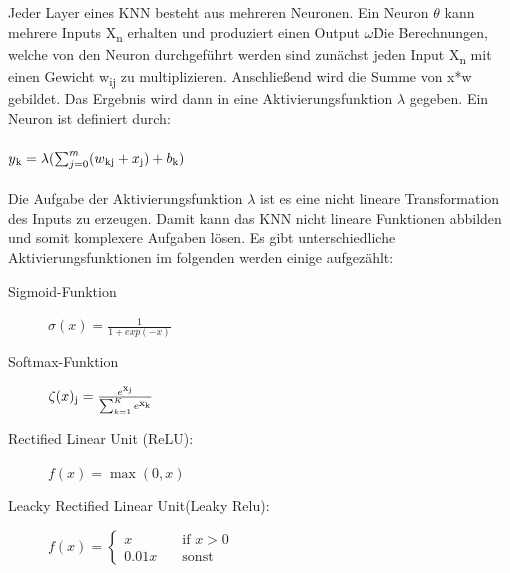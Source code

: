\documentclass{llncs}
\begin{document}
Jeder Layer eines KNN besteht aus mehreren Neuronen. Ein Neuron $\theta$ kann mehrere Inputs X\textsubscript{n} erhalten und produziert einen Output $\omega$\. Die Berechnungen, welche von den Neuron durchgeführt werden sind zunächst jeden Input X\textsubscript{n} mit einen Gewicht w\textsubscript{ij} zu multiplizieren. Anschließend wird die Summe von x*w gebildet. Das Ergebnis wird dann in eine Aktivierungsfunktion $\lambda$ gegeben. Ein Neuron ist definiert durch:
\\\\
\begin{math}
y\textsubscript{k} = \lambda(\sum_{j=0}^{m}(w\textsubscript{kj}+x\textsubscript{j})+b\textsubscript{k})                
\end{math}
\\\\
Die Aufgabe der Aktivierungsfunktion $\lambda$  ist es eine nicht lineare Transformation des Inputs zu erzeugen. Damit kann das KNN nicht lineare Funktionen abbilden und somit komplexere Aufgaben lösen. Es gibt unterschiedliche Aktivierungsfunktionen im folgenden werden einige aufgezählt:
\vspace{5 mm}
\begin{description}
	\item[Sigmoid-Funktion]		
	
	\begin{math}
	\sigma(x)=\frac{1}{1+exp(-x)}
	\end{math}
	\vspace{5 mm}
	\item[Softmax-Funktion]
	
	\begin{math}
	\zeta(x)\textsubscript{j} = \frac{e\textsuperscript{x\textsubscript{j}}}{\sum_{k=1}^{K}e\textsuperscript{x\textsubscript{k}}}
	\end{math}
	\vspace{5 mm}
	\item[Rectified Linear Unit (ReLU):]
	
	\begin{math}
	f(x)=\max(0,x) 
	\end{math}
	\vspace{5 mm}
	\item[Leacky Rectified Linear Unit(Leaky Relu):]
	
	\begin{math}
	f(x) = \begin{cases}
	x  	 & \quad \text{if } x > 0\\
	0.01x & \quad \text{sonst} 
	\end{cases}
	\end{math}
	\vspace{5 mm}
\end{description}
\end{document}
